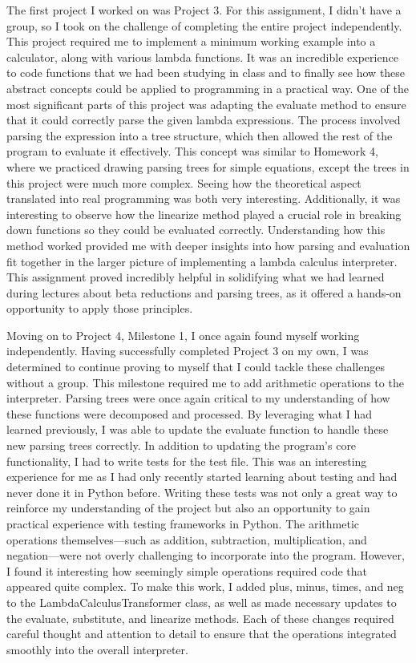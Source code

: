 \documentclass{article}
\theoremstyle{plain}
\theoremstyle{definition}
\theoremstyle{remark}
\begin{document}
The first project I worked on was Project 3. For this assignment, I didn’t have a group, so I took on the challenge of completing the entire project independently. This project required me to implement a minimum working example into a calculator, along with various lambda functions. It was an incredible experience to code functions that we had been studying in class and to finally see how these abstract concepts could be applied to programming in a practical way. One of the most significant parts of this project was adapting the evaluate method to ensure that it could correctly parse the given lambda expressions. The process involved parsing the expression into a tree structure, which then allowed the rest of the program to evaluate it effectively. This concept was similar to Homework 4, where we practiced drawing parsing trees for simple equations, except the trees in this project were much more complex. Seeing how the theoretical aspect translated into real programming was both very interesting. Additionally, it was interesting to observe how the linearize method played a crucial role in breaking down functions so they could be evaluated correctly. Understanding how this method worked provided me with deeper insights into how parsing and evaluation fit together in the larger picture of implementing a lambda calculus interpreter. This assignment proved incredibly helpful in solidifying what we had learned during lectures about beta reductions and parsing trees, as it offered a hands-on opportunity to apply those principles. 


Moving on to Project 4, Milestone 1, I once again found myself working independently. Having successfully completed Project 3 on my own, I was determined to continue proving to myself that I could tackle these challenges without a group. This milestone required me to add arithmetic operations to the interpreter. Parsing trees were once again critical to my understanding of how these functions were decomposed and processed. By leveraging what I had learned previously, I was able to update the evaluate function to handle these new parsing trees correctly. In addition to updating the program's core functionality, I had to write tests for the test file. This was an interesting experience for me as I had only recently started learning about testing and had never done it in Python before. Writing these tests was not only a great way to reinforce my understanding of the project but also an opportunity to gain practical experience with testing frameworks in Python. The arithmetic operations themselves—such as addition, subtraction, multiplication, and negation—were not overly challenging to incorporate into the program. However, I found it interesting how seemingly simple operations required code that appeared quite complex. To make this work, I added plus, minus, times, and neg to the LambdaCalculusTransformer class, as well as made necessary updates to the evaluate, substitute, and linearize methods. Each of these changes required careful thought and attention to detail to ensure that the operations integrated smoothly into the overall interpreter. 
\end{document}
